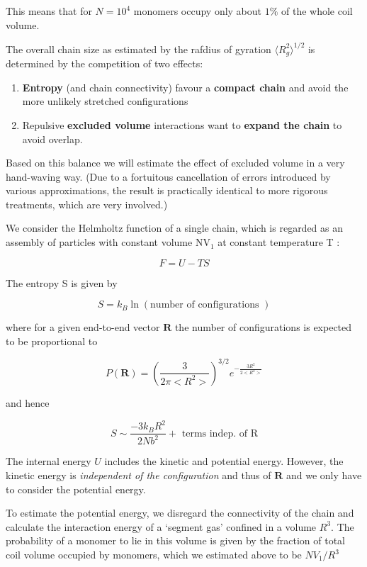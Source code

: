 \documentclass[
  letterpaper,
  enabledeprecatedfontcommands]{report}
\providecommand{\tightlist}{%
  \setlength{\itemsep}{0pt}\setlength{\parskip}{0pt}}
\begin{document}
This means that for \(N=10^{4}\) monomers occupy only about \(1 \%\) of
the whole coil volume.

The overall chain size as estimated by the rafdius of gyration
\(\langle R_{g}^{2}\rangle^{1 / 2}\) is determined by the competition of
two effects:

\begin{enumerate}
\def\labelenumi{\arabic{enumi}.}
\tightlist
\item
  \textbf{Entropy} (and chain connectivity) favour a \textbf{compact
  chain} and avoid the more unlikely stretched configurations
\item
  Repulsive \textbf{excluded volume} interactions want to \textbf{expand
  the chain} to avoid overlap.
\end{enumerate}

Based on this balance we will estimate the effect of excluded volume in
a very hand-waving way. (Due to a fortuitous cancellation of errors
introduced by various approximations, the result is practically
identical to more rigorous treatments, which are very involved.)

We consider the Helmholtz function of a single chain, which is regarded
as an assembly of particles with constant volume \(\mathrm{NV}_{1}\) at
constant temperature T :

\[
F=U-T S
\]

The entropy S is given by

\[
S=k_{B} \ln (\text {number of configurations })
\]

where for a given end-to-end vector \(\mathbf{R}\) the number of
configurations is expected to be proportional to

\[
P(\mathbf{R})=\left(\frac{3}{2 \pi<R^{2}>}\right)^{3 / 2} e^{-\frac{3 R^{2}}{2<R^{2}>}}
\]

and hence

\[
S \sim \frac{-3 k_{B} R^{2}}{2 N b^{2}}+\text { terms indep. of } \mathrm{R}
\]

The internal energy \(U\) includes the kinetic and potential energy.
However, the kinetic energy is \emph{independent of the configuration}
and thus of \(\mathbf{R}\) and we only have to consider the potential
energy.

To estimate the potential energy, we disregard the connectivity of the
chain and calculate the interaction energy of a `segment gas' confined
in a volume \(R^{3}\). The probability of a monomer to lie in this
volume is given by the fraction of total coil volume occupied by
monomers, which we estimated above to be \(N V_{1} / R^{3}\)
\end{document}
